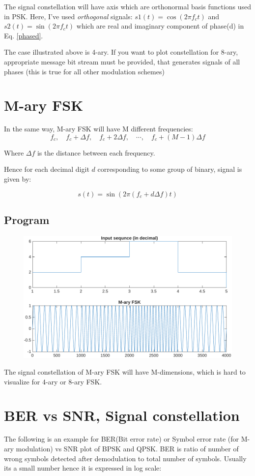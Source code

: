The signal constellation will have axis which are orthonormal basis functions used in PSK. 
Here, I've used \textit{orthogonal} signals: $s1(t) = \cos(2\pi f_c t)$ and $s2(t) = \sin(2\pi f_c t)$
which are real and imaginary component of phase(d) in Eq. \ref{phased}.

The case illustrated above is 4-ary. If you want to plot constellation for 8-ary, appropriate message bit stream must be provided, that generates signals of all phases (this is true for all other modulation schemes)

\section{M-ary FSK}

In the same way, M-ary FSK will have M different frequencies: $$f_c, \quad f_c + \Delta f, \quad f_c + 2\Delta f, \quad \cdots, \quad f_c + (M-1)\Delta f$$

Where $\Delta f$ is the distance between each frequency.

Hence for each decimal digit $d$ corresponding to some group of binary, signal is given by:

$$s(t) = \sin\left(2\pi (f_c + d \Delta f) t\right)$$

\subsection*{Program}
\begin{figure}[!ht]
	\centering
	\includegraphics[width=0.8\linewidth]{img/mfsk.pdf}
\end{figure}

The signal constellation of M-ary FSK will have M-dimensions, which is hard to visualize for 4-ary or 8-ary FSK.

\section{BER vs SNR, Signal constellation}
The following is an example for BER(Bit error rate) or Symbol error rate (for M-ary modulation) vs SNR plot of BPSK and QPSK. BER is ratio of number of wrong symbols detected after demodulation to total number of symbols. Usually its a small number hence it is expressed in log scale:

